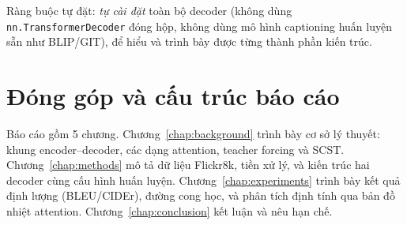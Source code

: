 Ràng buộc tự đặt: \emph{tự cài đặt} toàn bộ decoder (không dùng
\texttt{nn.TransformerDecoder} đóng hộp, không dùng mô hình captioning huấn luyện
sẵn như BLIP/GIT), để hiểu và trình bày được từng thành phần kiến trúc.

\section{Đóng góp và cấu trúc báo cáo}

Báo cáo gồm 5 chương. Chương~\ref{chap:background} trình bày cơ sở lý thuyết:
khung encoder--decoder, các dạng attention, teacher forcing và SCST.
Chương~\ref{chap:methods} mô tả dữ liệu Flickr8k, tiền xử lý, và kiến trúc hai
decoder cùng cấu hình huấn luyện. Chương~\ref{chap:experiments} trình bày kết quả
định lượng (BLEU/CIDEr), đường cong học, và phân tích định tính qua bản đồ nhiệt
attention. Chương~\ref{chap:conclusion} kết luận và nêu hạn chế.
